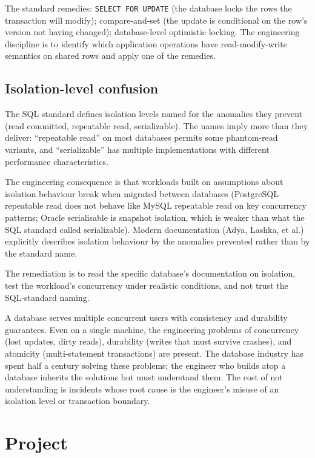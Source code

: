 The standard remedies: \texttt{SELECT FOR UPDATE} (the database locks the rows the transaction will modify); compare-and-set (the update is conditional on the row's version not having changed); database-level optimistic locking. The engineering discipline is to identify which application operations have read-modify-write semantics on shared rows and apply one of the remedies.

\subsection{Isolation-level confusion}

The SQL standard defines isolation levels named for the anomalies they prevent (read committed, repeatable read, serializable). The names imply more than they deliver: ``repeatable read'' on most databases permits some phantom-read variants, and ``serializable'' has multiple implementations with different performance characteristics.

The engineering consequence is that workloads built on assumptions about isolation behaviour break when migrated between databases (PostgreSQL repeatable read does not behave like MySQL repeatable read on key concurrency patterns; Oracle serialisable is snapshot isolation, which is weaker than what the SQL standard called serializable). Modern documentation (Adya, Lashka, et al.) explicitly describes isolation behaviour by the anomalies prevented rather than by the standard name.

The remediation is to read the specific database's documentation on isolation, test the workload's concurrency under realistic conditions, and not trust the SQL-standard naming.

\begin{principle}
A database serves multiple concurrent users with consistency and durability guarantees. Even on a single machine, the engineering problems of concurrency (lost updates, dirty reads), durability (writes that must survive crashes), and atomicity (multi-statement transactions) are present. The database industry has spent half a century solving these problems; the engineer who builds atop a database inherits the solutions but must understand them. The cost of not understanding is incidents whose root cause is the engineer's misuse of an isolation level or transaction boundary.
\end{principle}

\section{Project}


